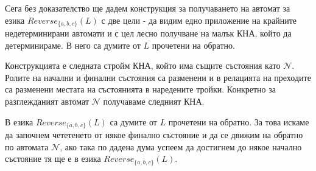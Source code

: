 \documentclass[12pt]{article}
\begin{document}
Сега без доказателство ще дадем конструкция за получаването на автомат за езика \(Reverse_{\{a,b, c\}}(L)\)
с две цели - да видим едно приложение на крайните недетерминирани автомати и с цел лесно получване на малък КНА, който да детерминираме.
В него са думите от \(L\) прочетени на обратно.\\\par
Конструкцията е следната стройм КНА, който има същите състояния като \(\mathcal{N}\).
Ролите на начални и финални състояния са разменени и в релацията на преходите са разменени местата на състоянията в наредените тройки.
Конкретно за разглежданият автомат \(\mathcal{N}\) получаваме следният КНА.
\begin{center}
\end{center}
В езика \(Reverse_{\{a,b, c\}}(L)\) са думите от \(L\) прочетени на обратно.
За това искаме да започнем чететенето от някое финално състояние и да се движим на обратно по автомата \(\mathcal{N}\),
ако така по дадена дума успеем да достигнем до някое начално състояние тя ще е в езика \(Reverse_{\{a,b, c\}}(L)\).
\end{document}
